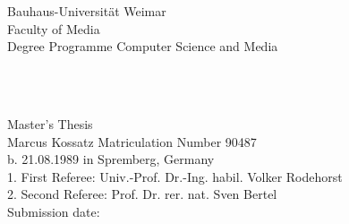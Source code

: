 
\begin{titlepage}

Bauhaus-Universität Weimar \\
Faculty of Media \\
Degree Programme Computer Science and Media \\ [2.0cm]

\begin{center}

{\huge \titleFirst} \\[0.5cm]
{\huge \titleSecond} \\[3.5cm]
\end{center}

{\LARGE Master's Thesis} \\[1.0cm]

Marcus Kossatz \hfill Matriculation Number 90487 \\
b. 21.08.1989 in Spremberg, Germany \\

1. First Referee: Univ.-Prof. Dr.-Ing. habil. Volker Rodehorst \\
2. Second Referee: Prof. Dr. rer. nat. Sven Bertel \\

\vfill
Submission date: \submissionDate

\end{titlepage}
